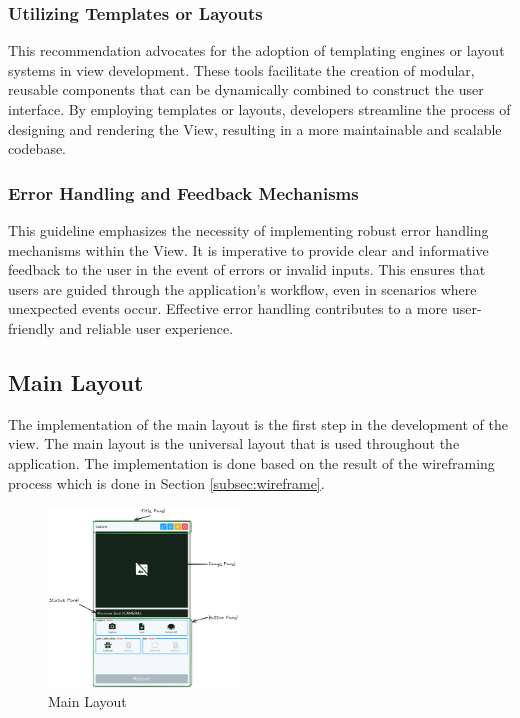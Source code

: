 \subsubsection{Utilizing Templates or Layouts}
This recommendation advocates for the adoption of templating engines or layout systems in view development. These tools facilitate the creation of modular, reusable components that can be dynamically combined to construct the user interface. By employing templates or layouts, developers streamline the process of designing and rendering the View, resulting in a more maintainable and scalable codebase.

\subsubsection{Error Handling and Feedback Mechanisms}
This guideline emphasizes the necessity of implementing robust error handling mechanisms within the View. It is imperative to provide clear and informative feedback to the user in the event of errors or invalid inputs. This ensures that users are guided through the application's workflow, even in scenarios where unexpected events occur. Effective error handling contributes to a more user-friendly and reliable user experience.

\subsection {Main Layout}
The implementation of the main layout is the first step in the development of the view. The main layout is the universal layout that is used throughout the application. The implementation is done based on the result of the wireframing process which is done in Section \ref{subsec:wireframe}.

\begin{figure}[!ht]
    \centering
    \includegraphics[width=0.45\textwidth]{texs/Part2/chapter4/image/mainlayout.png}
    \caption{Main Layout}
    \label{fig:main_layout}
\end{figure}

